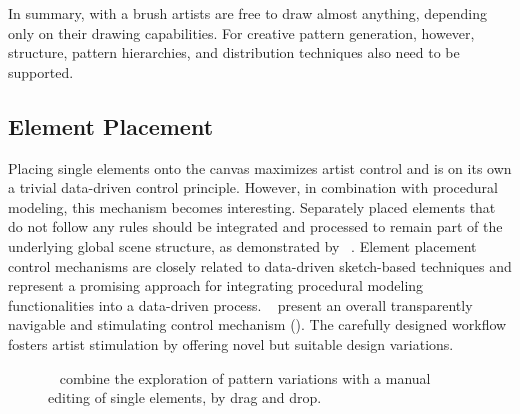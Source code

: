 

In summary, with a brush artists are free to draw almost anything, depending only on their drawing capabilities. For creative pattern generation, however, structure, pattern hierarchies, and distribution techniques also need to be supported. 



\subsection{Element Placement}
\label{subsubsec:analysis_creative_means_elements}

Placing single elements onto the canvas maximizes artist control and is on its own a trivial data-driven control principle. However, in combination with procedural modeling, this mechanism becomes interesting. Separately placed elements that do not follow any rules should be integrated and processed to remain part of the underlying global scene structure, as demonstrated by \citeauthor*{gieseke_2017_ooo}~\cite{gieseke_2017_ooo}.
Element placement control mechanisms are closely related to data-driven sketch-based techniques and represent a promising approach for integrating procedural modeling functionalities into a data-driven process. \citeauthor*{guerrero_2016_pep}~\cite{guerrero_2016_pep} present an overall transparently navigable and stimulating control mechanism (). The carefully designed workflow fosters artist stimulation by offering novel but suitable design variations.

\begin{figure}
    \centering
    \caption{\label{fig:guerrero_2016_pep}\citeauthor*{guerrero_2016_pep}~\cite{guerrero_2016_pep} combine the exploration of pattern variations with a manual editing of single elements, \eg by drag and drop.}
\end{figure}
